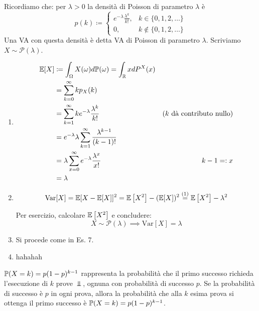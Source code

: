 Ricordiamo che: per $\lambda  >0$ la densità di Poisson di parametro $\lambda $ è
\begin{equation*}
p( k) \coloneqq \begin{cases}
e^{-\lambda }\frac{\lambda ^{k}}{k!} , & k\in \{0,1,2,\dots \}\\
0, & k\notin \{0,1,2,\dots \}
\end{cases}
\end{equation*}
Una VA con questa densità è detta VA di Poisson di parametro $\lambda $. Scriviamo $X\sim \mathcal{P}( \lambda )$.
\begin{enumerate}
\item \begin{align*}
\mathbb{E}[ X] & \coloneqq \int _{\Omega } X( \omega ) d\mathbb{P}( \omega ) =\int _{\mathbb{R}} xdP^{X}( x) & \\
 & =\sum\limits _{k=0}^{\infty } kp_{X}( k) & \\
 & =\sum\limits _{k=1}^{\infty } ke^{-\lambda }\frac{\lambda ^{k}}{k!} & \text{(} k\ \text{dà contributo nullo)}\\
 & =e^{-\lambda } \lambda \sum\limits _{k=1}^{\infty }\frac{\lambda ^{k-1}}{( k-1) !} & \\
 & =\lambda \sum\limits _{x=0}^{\infty } e^{-\lambda }\frac{\lambda ^{x}}{x!} & k-1=:x\\
 & =\lambda  & 
\end{align*}
\item \begin{equation*}
\mathrm{Var}[ X] =\mathbb{E}[ X-\mathbb{E}[ X]]^{2} =\mathbb{E}\left[ X^{2}\right] -(\mathbb{E}[ X])^{2}\overset{( 1)}{=}\mathbb{E}\left[ X^{2}\right] -\lambda ^{2}
\end{equation*}

Per esercizio, calcolare $\mathbb{E}\left[ X^{2}\right]$ e concludere:\begin{equation*}
X\sim \mathcal{P}( \lambda ) \implies \mathrm{Var}[ X] =\lambda 
\end{equation*}
\item Si procede come in Es. 7.
\item hahahah
\end{enumerate}
\Soluzione
\begin{oss}
$\mathbb{P}( X=k) =p( 1-p)^{k-1}$ rappresenta la probabilità che il primo successo richieda l'esecuzione di $k$ prove $\Bot $, ognuna con probabilità di successo $p$. Se la probabilità di successo è $p$ in ogni prova, allora la probabilità che alla $k$ esima prova si ottenga il primo successo è $\mathbb{P}( X=k) =p( 1-p)^{k-1}$.
\end{oss}
